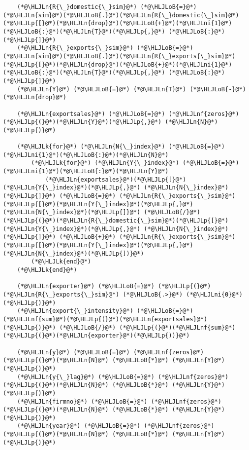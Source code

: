\documentclass[12pt,a4paper]{article}
\newcommand{\HLJLk}[1]{\textcolor[RGB]{148,91,176}{\textbf{#1}}}
\newcommand{\HLJLn}[1]{#1}
\newcommand{\HLJLnf}[1]{\textcolor[RGB]{66,102,213}{#1}}
\newcommand{\HLJLni}[1]{\textcolor[RGB]{59,151,46}{#1}}
\newcommand{\HLJLoB}[1]{\textcolor[RGB]{102,102,102}{\textbf{#1}}}
\newcommand{\HLJLp}[1]{#1}
\begin{document}
\begin{lstlisting}
    (*@\HLJLn{R{\_}domestic{\_}sim}@*) (*@\HLJLoB{=}@*) (*@\HLJLn{sim}@*)(*@\HLJLoB{.}@*)(*@\HLJLn{R{\_}domestic{\_}sim}@*)(*@\HLJLp{[}@*)(*@\HLJLn{drop}@*)(*@\HLJLoB{+}@*)(*@\HLJLni{1}@*)(*@\HLJLoB{:}@*)(*@\HLJLn{T}@*)(*@\HLJLp{,}@*) (*@\HLJLoB{:}@*)(*@\HLJLp{]}@*)
    (*@\HLJLn{R{\_}exports{\_}sim}@*) (*@\HLJLoB{=}@*) (*@\HLJLn{sim}@*)(*@\HLJLoB{.}@*)(*@\HLJLn{R{\_}exports{\_}sim}@*)(*@\HLJLp{[}@*)(*@\HLJLn{drop}@*)(*@\HLJLoB{+}@*)(*@\HLJLni{1}@*)(*@\HLJLoB{:}@*)(*@\HLJLn{T}@*)(*@\HLJLp{,}@*) (*@\HLJLoB{:}@*)(*@\HLJLp{]}@*)
    (*@\HLJLn{Y}@*) (*@\HLJLoB{=}@*) (*@\HLJLn{T}@*) (*@\HLJLoB{-}@*) (*@\HLJLn{drop}@*)

    (*@\HLJLn{exportsales}@*) (*@\HLJLoB{=}@*) (*@\HLJLnf{zeros}@*)(*@\HLJLp{(}@*)(*@\HLJLn{Y}@*)(*@\HLJLp{,}@*) (*@\HLJLn{N}@*)(*@\HLJLp{)}@*)

    (*@\HLJLk{for}@*) (*@\HLJLn{N{\_}index}@*) (*@\HLJLoB{=}@*) (*@\HLJLni{1}@*)(*@\HLJLoB{:}@*)(*@\HLJLn{N}@*)
        (*@\HLJLk{for}@*) (*@\HLJLn{Y{\_}index}@*) (*@\HLJLoB{=}@*) (*@\HLJLni{1}@*)(*@\HLJLoB{:}@*)(*@\HLJLn{Y}@*)
            (*@\HLJLn{exportsales}@*)(*@\HLJLp{[}@*)(*@\HLJLn{Y{\_}index}@*)(*@\HLJLp{,}@*) (*@\HLJLn{N{\_}index}@*)(*@\HLJLp{]}@*) (*@\HLJLoB{=}@*) (*@\HLJLn{R{\_}exports{\_}sim}@*)(*@\HLJLp{[}@*)(*@\HLJLn{Y{\_}index}@*)(*@\HLJLp{,}@*) (*@\HLJLn{N{\_}index}@*)(*@\HLJLp{]}@*) (*@\HLJLoB{/}@*) (*@\HLJLp{(}@*)(*@\HLJLn{R{\_}domestic{\_}sim}@*)(*@\HLJLp{[}@*)(*@\HLJLn{Y{\_}index}@*)(*@\HLJLp{,}@*) (*@\HLJLn{N{\_}index}@*)(*@\HLJLp{]}@*) (*@\HLJLoB{+}@*) (*@\HLJLn{R{\_}exports{\_}sim}@*)(*@\HLJLp{[}@*)(*@\HLJLn{Y{\_}index}@*)(*@\HLJLp{,}@*) (*@\HLJLn{N{\_}index}@*)(*@\HLJLp{])}@*)
        (*@\HLJLk{end}@*)
    (*@\HLJLk{end}@*)

    (*@\HLJLn{exporter}@*) (*@\HLJLoB{=}@*) (*@\HLJLp{(}@*)(*@\HLJLn{R{\_}exports{\_}sim}@*) (*@\HLJLoB{.>}@*) (*@\HLJLni{0}@*)(*@\HLJLp{)}@*)
    (*@\HLJLn{export{\_}intensity}@*) (*@\HLJLoB{=}@*) (*@\HLJLnf{sum}@*)(*@\HLJLp{(}@*)(*@\HLJLn{exportsales}@*)(*@\HLJLp{)}@*) (*@\HLJLoB{/}@*) (*@\HLJLp{(}@*)(*@\HLJLnf{sum}@*)(*@\HLJLp{(}@*)(*@\HLJLn{exporter}@*)(*@\HLJLp{))}@*)

    (*@\HLJLn{y}@*) (*@\HLJLoB{=}@*) (*@\HLJLnf{zeros}@*)(*@\HLJLp{(}@*)(*@\HLJLn{N}@*) (*@\HLJLoB{*}@*) (*@\HLJLn{Y}@*)(*@\HLJLp{)}@*)
    (*@\HLJLn{y{\_}lag}@*) (*@\HLJLoB{=}@*) (*@\HLJLnf{zeros}@*)(*@\HLJLp{(}@*)(*@\HLJLn{N}@*) (*@\HLJLoB{*}@*) (*@\HLJLn{Y}@*)(*@\HLJLp{)}@*)
    (*@\HLJLn{firmno}@*) (*@\HLJLoB{=}@*) (*@\HLJLnf{zeros}@*)(*@\HLJLp{(}@*)(*@\HLJLn{N}@*) (*@\HLJLoB{*}@*) (*@\HLJLn{Y}@*)(*@\HLJLp{)}@*)
    (*@\HLJLn{year}@*) (*@\HLJLoB{=}@*) (*@\HLJLnf{zeros}@*)(*@\HLJLp{(}@*)(*@\HLJLn{N}@*) (*@\HLJLoB{*}@*) (*@\HLJLn{Y}@*)(*@\HLJLp{)}@*)


\end{lstlisting}
\end{document}
